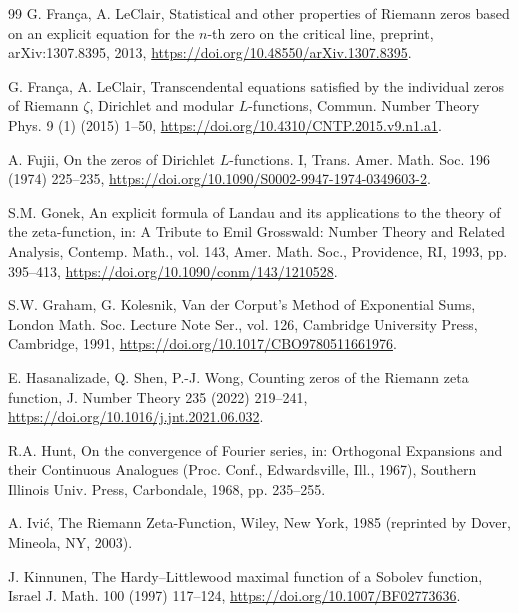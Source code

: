 \documentclass[preprint,12pt]{elsarticle}
\numberwithin{equation}{section}
\theoremstyle{plain}
\theoremstyle{definition}
\theoremstyle{remark}
\begin{document}
\begin{thebibliography}{99}
G. Fran\c{c}a, A. LeClair, Statistical and other properties of Riemann zeros based on an explicit equation for the $n$-th zero on the critical line, preprint, arXiv:1307.8395, 2013, \href{https://doi.org/10.48550/arXiv.1307.8395}{https://doi.org/10.48550/arXiv.1307.8395}.

G. Fran\c{c}a, A. LeClair, Transcendental equations satisfied by the individual zeros of Riemann $\zeta$, Dirichlet and modular $L$-functions, Commun. Number Theory Phys. 9 (1) (2015) 1--50, \href{https://doi.org/10.4310/CNTP.2015.v9.n1.a1}{https://doi.org/10.4310/CNTP.2015.v9.n1.a1}.

A. Fujii, On the zeros of Dirichlet $L$-functions. I, Trans. Amer. Math. Soc. 196 (1974) 225--235, \href{https://doi.org/10.1090/S0002-9947-1974-0349603-2}{https://doi.org/10.1090/S0002-9947-1974-0349603-2}.

S.M. Gonek, An explicit formula of Landau and its applications to the theory of the zeta-function, in: A Tribute to Emil Grosswald: Number Theory and Related Analysis, Contemp. Math., vol. 143, Amer. Math. Soc., Providence, RI, 1993, pp. 395--413, \href{https://doi.org/10.1090/conm/143/1210528}{https://doi.org/10.1090/conm/143/1210528}.

S.W. Graham, G. Kolesnik, Van der Corput's Method of Exponential Sums, London Math. Soc. Lecture Note Ser., vol. 126, Cambridge University Press, Cambridge, 1991, \href{https://doi.org/10.1017/CBO9780511661976}{https://doi.org/10.1017/CBO9780511661976}.

E. Hasanalizade, Q. Shen, P.-J. Wong, Counting zeros of the Riemann zeta function, J. Number Theory 235 (2022) 219--241, \href{https://doi.org/10.1016/j.jnt.2021.06.032}{https://doi.org/10.1016/j.jnt.2021.06.032}.

R.A. Hunt, On the convergence of Fourier series, in: Orthogonal Expansions and their Continuous Analogues (Proc. Conf., Edwardsville, Ill., 1967), Southern Illinois Univ. Press, Carbondale, 1968, pp. 235--255.

A. Ivi\'c, The Riemann Zeta-Function, Wiley, New York, 1985 (reprinted by Dover, Mineola, NY, 2003).

J. Kinnunen, The Hardy--Littlewood maximal function of a Sobolev function, Israel J. Math. 100 (1997) 117--124, \href{https://doi.org/10.1007/BF02773636}{https://doi.org/10.1007/BF02773636}.


\end{thebibliography}
\end{document}
